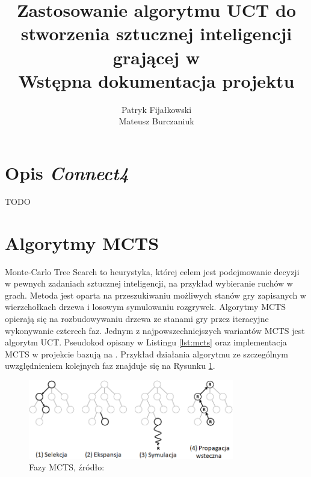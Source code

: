 \documentclass[a4paper,12pt]{article}
\title{
	Zastosowanie algorytmu UCT do stworzenia sztucznej inteligencji grającej w \nazwagry\\
	\large Wstępna dokumentacja projektu}
\author{Patryk Fijałkowski \\ Mateusz Burczaniuk}
\let\oldsection\section
\renewcommand\section{\clearpage\oldsection}
\newcommand{\nazwagry}{\textit{Connect4}}
\begin{document}
\begin{titlingpage}
	\maketitle
	\vspace{3cm}
\end{titlingpage}


\section{Opis \nazwagry}
TODO

\section{Algorytmy MCTS}
Monte-Carlo Tree Search to heurystyka, której celem jest podejmowanie decyzji w pewnych zadaniach sztucznej inteligencji, na przykład wybieranie ruchów w grach. Metoda jest oparta na przeszukiwaniu możliwych stanów gry zapisanych w wierzchołkach drzewa i losowym symulowaniu rozgrywek. Algorytmy MCTS opierają się na rozbudowywaniu drzewa ze stanami gry przez iteracyjne wykonywanie czterech faz. Jednym z najpowszechniejszych wariantów MCTS jest algorytm UCT. Pseudokod opisany w Listingu \ref{lst:mcts} oraz implementacja MCTS w projekcie bazują na \cite{banditbased}. Przykład działania algorytmu ze szczególnym uwzględnieniem kolejnych faz znajduje się na Rysunku \ref{rys:mcts_phases}.

\begin{figure}[h]
	\centering
	\includegraphics[width=0.8\textwidth]{mcts_phases_pl.png}
	\caption{Fazy MCTS, źródło: \cite{mctsanalysis}}
	\label{rys:mcts_phases}
\end{figure}
\end{document}
